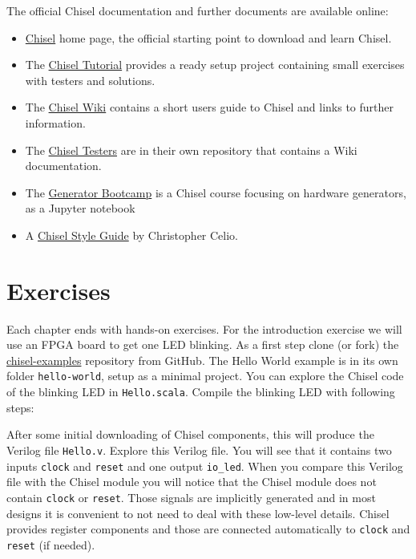 \documentclass[%
    10pt, %
    headinclude, footexclude,
    openright, %
    notitlepage,
    cleardoubleempty,
    headsepline,
    pointlessnumbers,
    bibtotoc, idxtotoc,
    ]{scrbook}
\newcommand{\code}[1]{{\small{\texttt{#1}}}}
\newcommand{\myref}[2]{\href{#1}{#2}}
\begin{document}
The official Chisel documentation and further documents are available online:

\begin{itemize}
\item \myref{https://chisel.eecs.berkeley.edu/}{Chisel} home page, the official starting point to
download and learn Chisel.
\item The \myref{https://github.com/ucb-bar/chisel-tutorial}{Chisel Tutorial} provides a ready setup
project containing small exercises with testers and solutions.

\item The \myref{https://github.com/freechipsproject/chisel3/wiki}{Chisel Wiki} contains
a short users guide to Chisel and links to further information.
\item The \myref{https://github.com/freechipsproject/chisel-testers}{Chisel Testers} are in
their own repository that contains a Wiki documentation.
\item The \myref{https://github.com/ucb-bar/generator-bootcamp}{Generator Bootcamp} is
a Chisel course focusing on hardware generators, as a Jupyter notebook
\item A \myref{https://github.com/ccelio/chisel-style-guide}{Chisel Style Guide} by Christopher Celio.
\end{itemize}

\section{Exercises}

Each chapter ends with hands-on exercises. For the introduction exercise we will use an
FPGA board to get one LED blinking.
As a first step clone (or fork) the \myref{https://github.com/schoeberl/chisel-examples}{chisel-examples}
repository from GitHub.
The Hello World example is in its own folder \code{hello-world}, setup as
a minimal project. You can explore the Chisel code of the blinking LED
in \code{Hello.scala}.
Compile the blinking LED with following steps:


After some initial downloading of Chisel components, this will produce the Verilog file \code{Hello.v}.
Explore this Verilog file. You will see that it contains two inputs \code{clock} and \code{reset}
and one output \code{io\_led}. When you compare this Verilog file with the Chisel module
you will notice that the Chisel module does not contain \code{clock} or \code{reset}.
Those signals are implicitly generated and in most designs it is convenient to not need to
deal with these low-level details. Chisel provides register components and those
are connected automatically to \code{clock} and \code{reset} (if needed).
\end{document}
